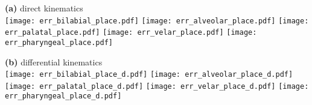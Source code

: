 \documentclass[varwidth=7.5in]{standalone}
\begin{document}
\raggedright

{\bf (a)} direct kinematics\\
\texttt{[image: err\_bilabial\_place.pdf]}%
\texttt{[image: err\_alveolar\_place.pdf]}%
\texttt{[image: err\_palatal\_place.pdf]}%
\texttt{[image: err\_velar\_place.pdf]}%
\texttt{[image: err\_pharyngeal\_place.pdf]}

{\bf (b)} differential kinematics\\
\texttt{[image: err\_bilabial\_place\_d.pdf]}%
\texttt{[image: err\_alveolar\_place\_d.pdf]}%
\texttt{[image: err\_palatal\_place\_d.pdf]}%
\texttt{[image: err\_velar\_place\_d.pdf]}%
\texttt{[image: err\_pharyngeal\_place\_d.pdf]}
\end{document}

